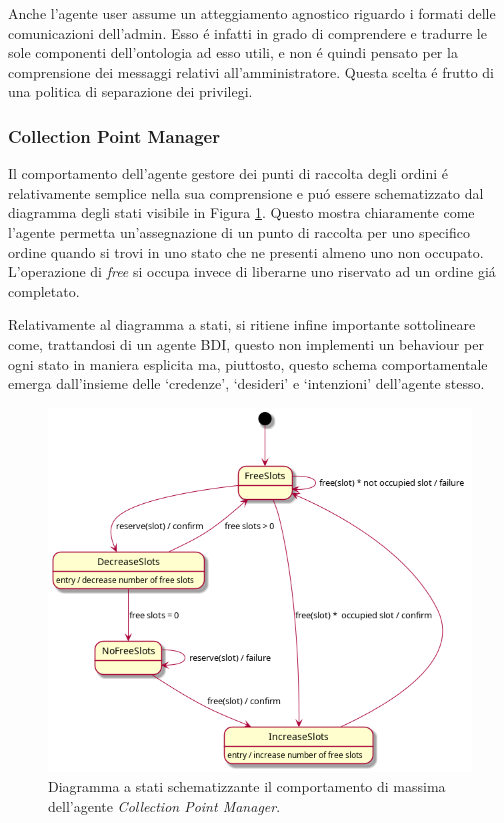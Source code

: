 Anche l'agente user assume un atteggiamento agnostico riguardo i formati delle comunicazioni dell'admin. Esso \'e infatti in grado di comprendere e tradurre le sole componenti dell'ontologia ad esso utili, e non \'e quindi pensato per la comprensione dei messaggi relativi all'amministratore. Questa scelta \'e frutto di una politica di separazione dei privilegi.

\subsubsection{Collection Point Manager}
Il comportamento dell'agente gestore dei punti di raccolta degli ordini \'e relativamente semplice nella sua comprensione e pu\'o essere schematizzato dal diagramma degli stati visibile in Figura \ref{fig:state-diagram-cpm}. Questo mostra chiaramente come l'agente permetta un'assegnazione di un punto di raccolta per uno specifico ordine quando si trovi in uno stato che ne presenti almeno uno non occupato. L'operazione di \textit{free} si occupa invece di liberarne uno riservato ad un ordine gi\'a completato.

\parag
Relativamente al diagramma a stati, si ritiene infine importante sottolineare come, trattandosi di un agente BDI, questo non implementi un behaviour per ogni stato in maniera esplicita ma, piuttosto, questo schema comportamentale emerga dall'insieme delle `credenze', `desideri' e `intenzioni' dell'agente stesso.
\begin{figure}[!ht]\centering
    \includegraphics[width=\textwidth]{section/design/figure/collection_point_manager/state_diagram.png}
    \caption{Diagramma a stati schematizzante il comportamento di massima dell'agente \textit{Collection Point Manager}.}
    \label{fig:state-diagram-cpm}
\end{figure}

